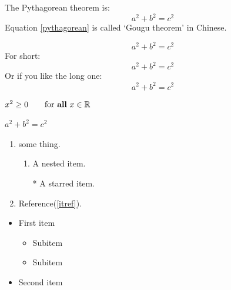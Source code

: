 \documentclass[UTF8]{ctexart}
\title{}
\author{}
\begin{document}
	\maketitle

	\begin{abstract}

	\end{abstract}


	\section{}



	The Pythagorean theorem is:
	\begin{equation}
		a^2 + b^2 = c^2 \label{pythagorean}
	\end{equation}
	Equation \eqref{pythagorean} is
	called `Gougu theorem' in Chinese.

	\begin{equation*}
		a^2 + b^2 = c^2
	\end{equation*}
	For short:
	\[a^2 + b^2 = c^2 \]
	Or if you like the long one:
	\begin{displaymath}
		a^2 + b^2 = c^2
	\end{displaymath}

	$x^{2} \geq 0 \qquad
	\text{for \textbf{all} }
	x\in\mathbb{R}$

	${a}^{2}+{b}^{2}={c}^{2}$

	\begin{enumerate}
		\item some thing.
		\begin{enumerate}
			\item A nested item.\label{itref}
			\item[*] A starred item.
		\end{enumerate}
		\item Reference(\ref{itref}).
	\end{enumerate}

	\renewcommand{\labelitemi}{\ddag}
	\renewcommand{\labelitemii}{\dag}
	\begin{itemize}
		\item First item
		\begin{itemize}
			\item Subitem
			\item Subitem
		\end{itemize}
		\item Second item
	\end{itemize}
\end{document}
